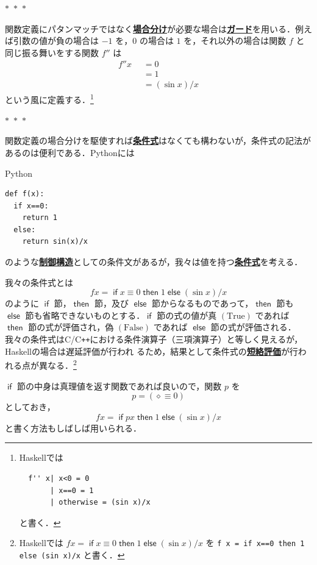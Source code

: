 \documentclass[a5paper,twoside,fleqn,draft]{jsbook}
\newcommand{\separator}{\begin{center}$*$~$*$~$*$\end{center}}
\newcommand{\programminglanguage}[1]{\textsf{#1}}
\newcommand{\clang}{\programminglanguage{C}}
\newcommand{\cxx}{\programminglanguage{C}\texttt{++}}
\newcommand{\haskell}{\programminglanguage{Haskell}}
\newcommand{\python}{\programminglanguage{Python}}
\newcommand{\keyword}[1]{{\underline{\textbf{#1}}}}
\newcommand{\code}[1]{\texttt{#1}}
\newenvironment{pythoncode}{\begin{itembox}[r]{\python}}{\end{itembox}}
\newcommand{\mKeyword}[1]{\mathsf{#1}}
\newcommand{\mIfKeyword}{\mKeyword{if}}
\newcommand{\mElseKeyword}{\mKeyword{else}}
\newcommand{\mOtherwiseKeyword}{\mKeyword{otherwise}}
\newcommand{\mThenKeyword}{\mKeyword{then}}
\DeclareMathOperator{\mElse}{\mElseKeyword}
\DeclareMathOperator{\mIf}{\mIfKeyword}
\DeclareMathOperator{\mOtherwise}{\mOtherwiseKeyword}
\DeclareMathOperator{\mThen}{\mThenKeyword}
\newcommand{\mSpecialConstant}[1]{\textrm{#1}}
\newcommand{\mFalse}{\mSpecialConstant{False}}
\newcommand{\mTrue}{\mSpecialConstant{True}}
\newcommand{\mAnonParam}{\diamond}
\newcommand{\mGuard}[1]{\mathop{\mid_{#1}}}
\newcommand{\mIfThenElseEXP}[3]{\mIf{#1}\mThen{#2}\mElse{#3}} %
\begin{document}
\separator

関数定義にパタンマッチではなく\keyword{場合分け}が必要な場合は\keyword{ガード}を用いる．例えば引数の値が負の場合は $-1$ を，$0$ の場合は $1$ を，それ以外の場合は関数 $f$ と同じ振る舞いをする関数 $f''$ は
\begin{equation}
  \begin{aligned}
    f''x&\mGuard{x<0}=0\\
    &\mGuard{x\equiv0}=1\\
    &\mGuard{\mOtherwise}=(\sin x)/x
  \end{aligned}
\end{equation}
という風に定義する．\footnote{\haskell では
\begin{verbatim}
  f'' x| x<0 = 0
       | x==0 = 1
       | otherwise = (sin x)/x
\end{verbatim}
と書く．}

\separator

関数定義の場合分けを駆使すれば\keyword{条件式}はなくても構わないが，条件式の記法があるのは便利である．\python には
\begin{pythoncode}
\begin{verbatim}
def f(x):
  if x==0:
    return 1
  else:
    return sin(x)/x
\end{verbatim}
\end{pythoncode}
のような\keyword{制御構造}としての条件文があるが，我々は値を持つ\keyword{条件式}を考える．

我々の条件式とは
\begin{equation}
  fx
  =\mIf x\equiv0
  \mThen1
  \mElse{}(\sin x)/x
\end{equation}
のように $\mIf$ 節，$\mThen$ 節，及び $\mElse$ 節からなるものであって，$\mThen$ 節も $\mElse$ 節も省略できないものとする．$\mIf$ 節の式の値が真 $(\mTrue)$ であれば $\mThen$ 節の式が評価され，偽 $(\mFalse)$ であれば $\mElse$ 節の式が評価される．我々の条件式は\clang/\cxx における条件演算子（三項演算子）と等しく見えるが，\haskell の場合は遅延評価が行われ
るため，結果として条件式の\keyword{短絡評価}が行われる点が異なる．\footnote{\haskell では $fx=\mIfThenElseEXP{x\equiv0}{1}{{}(\sin x)/x}$ を \code{f x = if x==0 then 1 else (sin x)/x} と書く．}

$\mIf$ 節の中身は真理値を返す関数であれば良いので，関数 $p$ を
\begin{equation}
  p
  =(\mAnonParam\equiv0)
\end{equation}
としておき，
\begin{equation}
  fx
  =\mIf px
  \mThen1
  \mElse{}(\sin x)/x
\end{equation}
と書く方法もしばしば用いられる．
\end{document}
